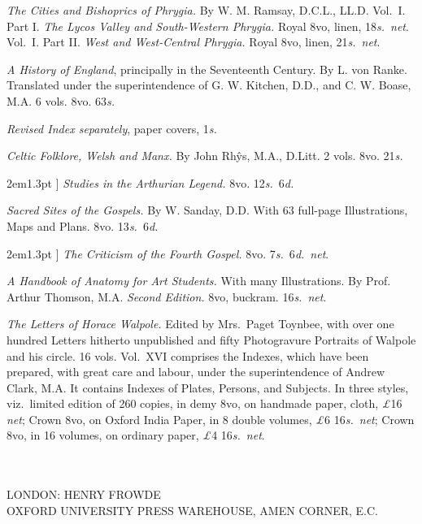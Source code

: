 \documentclass[12pt,oneside]{book}[2021/10/04]
\newcommand{\singleline}{
  \hspace*{0.33\textwidth}{\rule{0.33\textwidth}{0.4pt}}
}
\newcommand{\longdash}{\rule[.5ex]{2em}{1.3pt}
}
\newenvironment{advlist}{
  \begin{description}[leftmargin=1em, parsep=0.2ex, listparindent=1em,]
}{\end{description}}
\newcommand{\¬}{\hphantom{0}}
\begin{document}
\begin{advlist}
\item[Ramsay.] \textit{The Cities and
Bishoprics of Phrygia.} By W. M.
Ramsay, D.C.L., LL.D. Vol.\ I. Part
I. \textit{The Lycos Valley and South-Western
Phrygia.} Royal 8vo, linen, 18\textit{s.}\ \textit{net}.
Vol.\ I. Part II. \textit{West and West-Central
Phrygia.} Royal 8vo, linen, 21\textit{s.}\ \textit{net}.

\item[Ranke.] \textit{A History of England},
principally in the Seventeenth Century.
By L. von Ranke. Translated
under the superintendence of
G. W. Kitchen, D.D., and C. W.
Boase, M.A. 6 vols. 8vo. 63\textit{s.}

\textit{Revised Index separately}, paper
covers, 1\textit{s.}

\item[Rhŷs.] \textit{Celtic Folklore, Welsh
and Manx.} By John Rhŷs, M.A.,
D.Litt. 2 vols. 8vo. 21\textit{s.}

\item[\longdash] \textit{Studies in the Arthurian
Legend.} 8vo. 12\textit{s.}\ 6\textit{d.}

\item[Sanday.] \textit{Sacred Sites of the
Gospels.} By W. Sanday, D.D. With
63 full-page Illustrations, Maps and
Plans. 8vo. 13\textit{s.}\ 6\textit{d.}

\item[\longdash] \textit{The Criticism of the
Fourth Gospel.} 8vo. 7\textit{s.}\ 6\textit{d.}\ \textit{net}.

\item[Thomson.] \textit{A Handbook of
Anatomy for Art Students.} With many
Illustrations. By Prof. Arthur
Thomson, M.A. \textit{Second Edition.}
8vo, buckram. 16\textit{s.}\ \textit{net}.

\item[Walpole.] \textit{The Letters of
Horace Walpole.} Edited by Mrs.\
Paget Toynbee, with over one
hundred Letters hitherto unpublished
and fifty Photogravure Portraits
of Walpole and his circle.
16 vols. Vol.\ XVI comprises the
Indexes, which have been prepared,
with great care and labour, under
the superintendence of Andrew
Clark, M.A. It contains Indexes
of Plates, Persons, and Subjects.
In three styles, viz.\ limited edition
of 260 copies, in demy 8vo, on handmade
paper, cloth, \textit{£}16 \textit{net}; Crown
8vo, on Oxford India Paper, in 8
double volumes, \textit{£}6 16\textit{s.}\ \textit{net}; Crown
8vo, in 16 volumes, on ordinary
paper, \textit{£}4 16\textit{s.}\ \textit{net}.
\end{advlist}
\singleline
\vfill
\begin{center}
\large
{}\\
\normalsize
{}\\
\small
LONDON: HENRY FROWDE\\
\footnotesize
OXFORD UNIVERSITY PRESS WAREHOUSE, AMEN CORNER, E.C.
\end{center}
\end{document}
